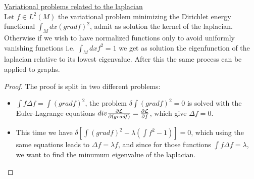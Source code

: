 \documentclass[../main.tex]{subfiles}
\begin{document}
\begin{prop}
    \underline{Variational problems related to the laplacian}\\
    Let $f \in L^2(M)$ the variational problem minimizing the Dirichlet energy functional $\int_M dx (gradf)^2$, 
    admit as solution the kernel of the laplacian. Otherwise if we wish to have normalized functions only
    to avoid uniformly vanishing functions i.e. $\int_M dx f^2 = 1$ we get as solution the eigenfunction of the laplacian
    relative to its lowest eigenvalue. After this the same process can be applied to graphs.
\end{prop}
\begin{proof} The proof is split in two different problems:
    \begin{itemize}
        \item 
	$\int f \Delta f = \int (gradf)^2$, the problem $\delta \int (gradf)^2 = 0$ is solved with the
	Euler-Lagrange equations $div \frac{\partial \mathcal{L}}{\partial (gradf)}=\frac{\partial \mathcal{L}}{\partial f}$, which give $\Delta f = 0$.
	\item
	This time we have $\delta[\int (gradf)^2 - \lambda (\int f^2 -1)]=0$, which using the same equations
	leads to $\Delta f = \lambda f$, and since for those functions $\int f \Delta f = \lambda$, we want to find
	the minumum eigenvalue of the laplacian.
    \end{itemize}
\end{proof}
\end{document}
